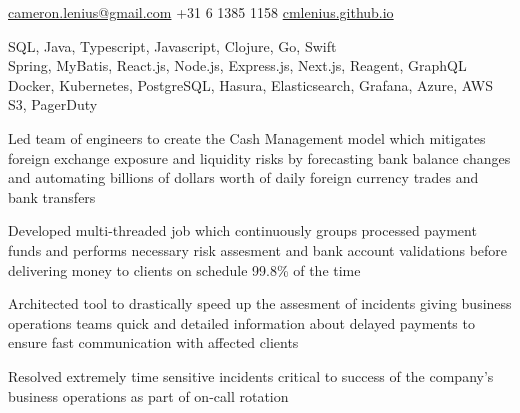 \documentclass[]{resume}
\begin{document}

\contactLineFn
  {\href{mailto:cameron.lenius@gmail.com}{cameron.lenius@gmail.com}}
  {+31 6 1385 1158}
  {\href{cmlenius.github.io}{cmlenius.github.io}}


 
 
\separatorLine
{} SQL, Java, Typescript, Javascript, Clojure, Go, Swift \\
 Spring, MyBatis, React.js, Node.js, Express.js, Next.js, Reagent, GraphQL \\
 Docker, Kubernetes, PostgreSQL, Hasura, Elasticsearch, Grafana, Azure, AWS S3, PagerDuty \\
 



\separatorLine
{}
\begin{tightemize}
\item Led team of engineers to create the Cash Management model which mitigates foreign exchange exposure and liquidity risks by forecasting bank balance changes and automating billions of dollars worth of daily foreign currency trades and bank transfers
\item Developed multi-threaded job which continuously groups processed payment funds and performs necessary risk assesment and bank account validations before delivering money to clients on schedule 99.8\% of the time
\item Architected tool to drastically speed up the assesment of incidents giving business operations teams quick and detailed information about delayed payments to ensure fast communication with affected clients
\item Resolved extremely time sensitive incidents critical to success of the company's business operations as part of on-call rotation
\end{tightemize}
\separatorM
\end{document}
